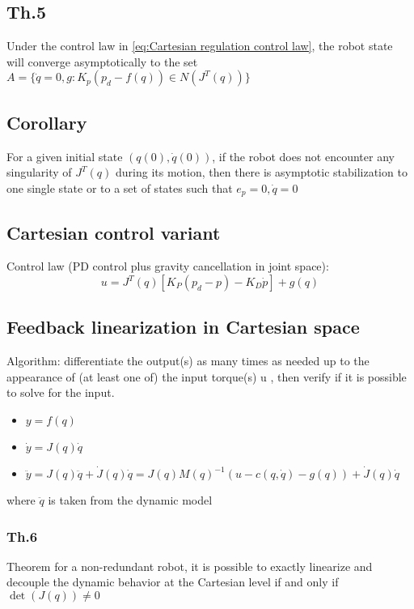 \documentclass[a4paper,12pt]{article}
\begin{document}
\subsection{Th.5}
Under the control law in \ref{eq:Cartesian regulation control law}, the 
robot state will converge asymptotically to the set 
$A = \{\dot{q}=0,g:K_p(p_d-f(q)) \in N(J^T(q))\}$
\subsection{Corollary}
For a given initial state $(q(0),\dot{q}(0))$, if the robot does not
encounter any singularity of $J^T(q)$ during its motion, then there 
is asymptotic
stabilization to one single state or to a set of
states such that $e_p=0, \dot{q}=0$
\subsection{Cartesian control variant}
Control law (PD control plus gravity cancellation in joint space):
\begin{equation}
    u = J^T(q)[K_P(p_d-p) - K_D\dot{p}] + g(q)
\end{equation}
\subsection{Feedback linearization in Cartesian space}
Algorithm: differentiate the output(s) as many times as needed
up to the appearance of (at least one of) the input torque(s) u ,
then verify if it is possible to solve for the input.
\begin{itemize}
\item $y=f(q)$
\item $\dot{y}=J(q)\dot{q}$
\item $\ddot{y}=J(q)\ddot{q}+ \dot{J}(q)\dot{q}= J(q)M(q)^{-1}(u-c(q,\dot{q})-g(q))+\dot{J}(q)\dot{q}$
\end{itemize}
where $\ddot{q}$ is taken from the dynamic model
\subsubsection{Th.6}
Theorem for a non-redundant robot, it is possible to exactly linearize and
decouple the dynamic behavior at the Cartesian level if and only if
$\det(J(q)) \neq 0$ 
\end{document}
